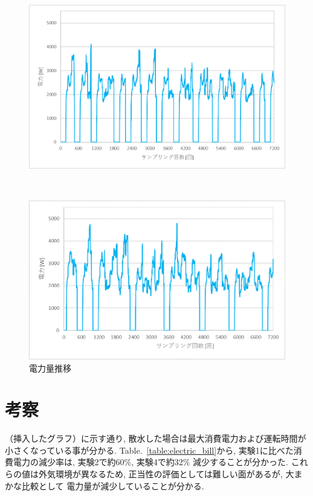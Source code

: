 \documentclass[a4j,fleqn,dvipdfmx,uplatex]{jsarticle}
\newcommand{\tableref}[1]{Table.\ \ref{#1}}
\begin{document}
\begin{figure}[htb]
\begin{minipage}[b]{0.45\linewidth}
    \end{minipage}
    \begin{minipage}[b]{0.45\linewidth}
      \centering
      \includegraphics[width=\linewidth]{img/0725_power.png}
    \end{minipage}\\
    \begin{minipage}[b]{0.45\linewidth}
      \centering
      \includegraphics[width=\linewidth]{img/0726_power.png}
    \end{minipage}
  \caption{電力量推移}
  \label{fig2:ex_outputs}
\end{figure}

\section{考察}
（挿入したグラフ）に示す通り, 散水した場合は最大消費電力および運転時間が
小さくなっている事が分かる. 
\tableref{table:electric_bill}から, 実験1に比べた消費電力の減少率は, 実験2で約60\%, 
実験4で約32\% 減少することが分かった. 
これらの値は外気環境が異なるため, 正当性の評価としては難しい面があるが, 大まかな比較として
電力量が減少していることが分かる. 
\end{document}

